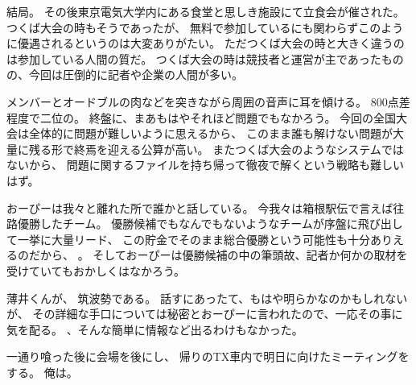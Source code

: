 結局。
その後東京電気大学内にある食堂と思しき施設にて立食会が催された。
つくば大会の時もそうであったが、
無料で参加しているにも関わらずこのように優遇されるというのは大変ありがたい。
ただつくば大会の時と大きく違うのは参加している人間の質だ。
つくば大会の時は競技者と運営が主であったものの、今回は圧倒的に記者や企業の人間が多い。

メンバーとオードブルの肉などを突きながら周囲の音声に耳を傾ける。
800点差程度で二位の。
終盤に、まあもはやそれほど問題でもなかろう。
今回の全国大会は全体的に問題が難しいように思えるから、
このまま誰も解けない問題が大量に残る形で終焉を迎える公算が高い。
またつくば大会のようなシステムではないから、
問題に関するファイルを持ち帰って徹夜で解くという戦略も難しいはず。

おーぴーは我々と離れた所で誰かと話している。
今我々は箱根駅伝で言えば往路優勝したチーム。
優勝候補でもなんでもないようなチームが序盤に飛び出して一挙に大量リード、
この貯金でそのまま総合優勝という可能性も十分ありえるのだから、
。
そしておーぴーは優勝候補の中の筆頭故、記者か何かの取材を受けていてもおかしくはなかろう。

薄井くんが、
筑波勢である。%
話すにあったて、もはや明らかなのかもしれないが、
その詳細な手口については秘密とおーぴーに言われたので、一応その事に気を配る。
、そんな簡単に情報など出るわけもなかった。

一通り喰った後に会場を後にし、
帰りのTX車内で明日に向けたミーティングをする。
俺は。
